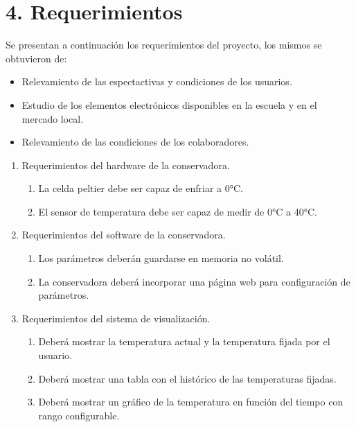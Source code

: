 \section{4. Requerimientos}
\label{sec:requerimientos}

Se presentan a continuación los requerimientos del proyecto, los mismos se obtuvieron de:

\begin{itemize}
  \item Relevamiento de las espectactivas y condiciones de los usuarios.
  \item Estudio de los elementos electrónicos disponibles en la escuela y en el mercado local.
  \item Relevamiento de las condiciones de los colaboradores.
\end{itemize}

\begin{enumerate}
  \item Requerimientos del hardware de la conservadora. 
  \begin{enumerate}
    \item La celda peltier debe ser capaz de enfriar a 0°C.
    \item El sensor de temperatura debe ser capaz de medir de 0°C a 40°C.
  \end{enumerate}
  \item Requerimientos del software de la conservadora.
  \begin{enumerate}
    \item Los parámetros deberán guardarse en memoria no volátil.
    \item La conservadora deberá incorporar una página web para configuración de parámetros.
  \end{enumerate}
  \item Requerimientos del sistema de visualización.
  \begin{enumerate}
    \item Deberá mostrar la temperatura actual y la temperatura fijada por el usuario.
    \item Deberá mostrar una tabla con el histórico de las temperaturas fijadas.
    \item Deberá mostrar un gráfico de la temperatura en función del tiempo con rango configurable.
  \end{enumerate} 
\end{enumerate}